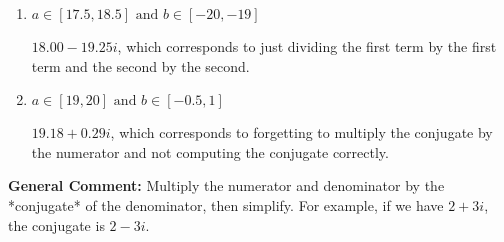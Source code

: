 \documentclass{extbook}[14pt]
\begin{document}
\begin{enumerate}
{\begin{enumerate}[label=\Alph*.]
 $-17.06  + 149.00 i$, which corresponds to forgetting to multiply the conjugate by the numerator.
\item \( a \in [17.5, 18.5] \text{ and } b \in [-20, -19] \)

 $18.00  - 19.25 i$, which corresponds to just dividing the first term by the first term and the second by the second.
\item \( a \in [19, 20] \text{ and } b \in [-0.5, 1] \)

 $19.18  + 0.29 i$, which corresponds to forgetting to multiply the conjugate by the numerator and not computing the conjugate correctly.
\end{enumerate}

\textbf{General Comment:} Multiply the numerator and denominator by the *conjugate* of the denominator, then simplify. For example, if we have $2+3i$, the conjugate is $2-3i$.
}
\end{enumerate}
\end{document}
